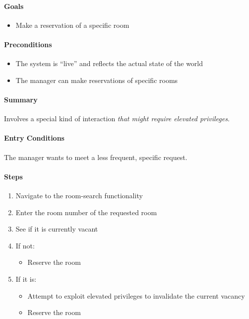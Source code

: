 \paragraph{Goals}

\begin{itemize}
\tightlist
\item
  Make a reservation of a specific room
\end{itemize}

\paragraph{Preconditions}

\begin{itemize}
\tightlist
\item
  The system is ``live'' and reflects the actual state of the world
\item
  The manager can make reservations of specific rooms
\end{itemize}

\paragraph{Summary}

Involves a special kind of interaction \emph{that might require elevated
privileges}.

\paragraph{Entry Conditions}

The manager wants to meet a less frequent, specific request.

\paragraph{Steps}

\begin{enumerate}
\def\labelenumi{\arabic{enumi}.}
\tightlist
\item
  Navigate to the room-search functionality
\item
  Enter the room number of the requested room
\item
  See if it is currently vacant
\item
  If not:

  \begin{itemize}
  \tightlist
  \item
    Reserve the room
  \end{itemize}
\item
  If it is:

  \begin{itemize}
  \tightlist
  \item
    Attempt to exploit elevated privileges to invalidate the current
    vacancy
  \item
    Reserve the room
  \end{itemize}
\end{enumerate}

